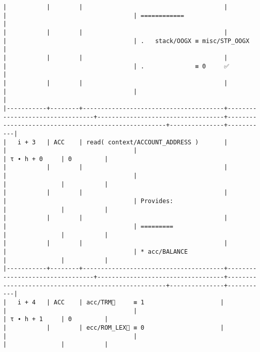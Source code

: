 \documentclass[varwidth=\maxdimen,margin=0.5cm,multi={verbatim}]{standalone}
\begin{document}
\begin{verbatim}
|           |        |                                       |                                 |                                   | ============                                        |
|           |        |                                       |                                 |                                   | .   stack/OOGX ≡ misc/STP_OOGX                      |
|           |        |                                       |                                 |                                   | .              ≡ 0     ✅                           |
|           |        |                                       |                                 |                                   |                                                     |
|-----------+--------+---------------------------------------+---------------------------------+-----------------------------------+-----------------------------------------------------+---------------+-----------|
|   i + 3   | ACC    | read( context/ACCOUNT_ADDRESS )       |                                 |                                   |                                                     | τ ∙ h + 0     | 0         |
|           |        |                                       |                                 |                                   |                                                     |               |           |
|           |        |                                       |                                 |                                   | Provides:                                           |               |           |
|           |        |                                       |                                 |                                   | =========                                           |               |           |
|           |        |                                       |                                 |                                   | * acc/BALANCE                                       |               |           |
|-----------+--------+---------------------------------------+---------------------------------+-----------------------------------+-----------------------------------------------------+---------------+-----------|
|   i + 4   | ACC    | acc/TRM🚩     ≡ 1                     |                                 |                                   |                                                     | τ ∙ h + 1     | 0         |
|           |        | ecc/ROM_LEX🚩 ≡ 0                     |                                 |                                   |                                                     |               |           |

\end{verbatim}
\end{document}
